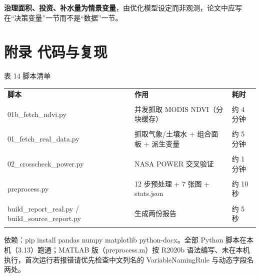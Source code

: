 \documentclass[11pt,a4paper]{ctexart}
\begin{document}
\textbf{治理面积、投资、补水量为情景变量}，由优化模型设定而非观测，论文中应写在“决策变量”一节而不是“数据”一节。


\section*{附录  代码与复现}
表 14  脚本清单


\begin{table}[H]\centering\small\setlength{\parskip}{2pt}
\begin{tabularx}{\textwidth}{|X|X|X|}
\toprule
\textbf{脚本} & \textbf{作用} & \textbf{耗时} \\\\
\midrule
01b\_fetch\_ndvi.py & 并发抓取 MODIS NDVI（分块缓存） & 约 4 分钟 \\\\
01\_fetch\_real\_data.py & 抓取气象/土壤水 + 组合面板 + 派生变量 & 约 5 分钟 \\\\
02\_crosscheck\_power.py & NASA POWER 交叉验证 & 约 1 分钟 \\\\
preprocess.py & 12 步预处理 + 7 张图 + stats.json & 约 10 秒 \\\\
build\_report\_real.py / build\_source\_report.py & 生成两份报告 & 约 5 秒 \\\\
\bottomrule
\end{tabularx}
\end{table}
依赖：pip install pandas numpy matplotlib python-docx。全部 Python 脚本在本机（3.13）跑通；MATLAB 版（preprocess.m）按 R2020b 语法编写、未在本机执行，首次运行若报错请优先检查中文列名的 VariableNamingRule 与动态字段名两处。
\end{document}
